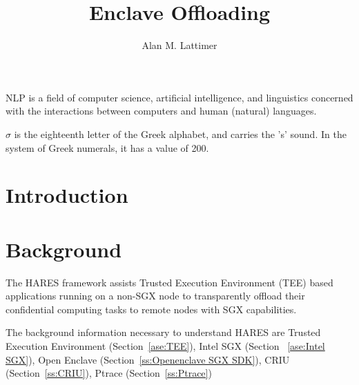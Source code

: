 \documentclass[article, doublespace,nopageskip]{VTthesis} %
\title{Enclave Offloading}
\author{Alan M. Lattimer}
\newcommand{\monitor}{HARES }
\begin{document}
  \frontmatter
  \maketitle
  \tableofcontents

	\listoffigures
	\listoftables
    \printnomenclature %

NLP is a field of computer science, artificial intelligence, and linguistics concerned with the interactions between computers and human (natural) languages.
 
 
$\sigma$ is the eighteenth letter of the Greek alphabet, and carries the 's' sound. In the system of Greek numerals, it has a value of 200. 
 

	\mainmatter

	\chapter{Introduction} \label{ch:introduction}

    \chapter{Background} \label{ch:Background}
    The \monitor framework assists Trusted Execution Environment (TEE) based applications running on a non-SGX node to transparently offload their confidential computing tasks to remote nodes with SGX capabilities. \

    The background information necessary to understand \monitor are Trusted Execution Environment (Section~\ref{ase:TEE}), Intel SGX (Section ~\ref{ase:Intel SGX}), Open Enclave (Section~\ref{ss:Openenclave SGX SDK}), CRIU (Section~\ref{ss:CRIU}), Ptrace (Section~\ref{ss:Ptrace})
\end{document}
